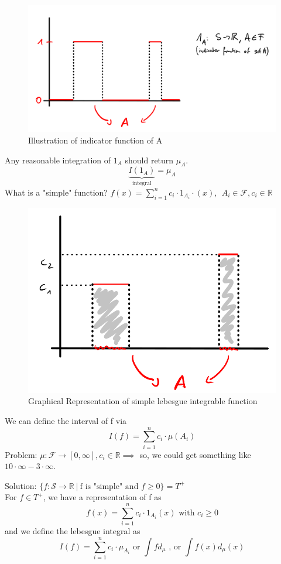 \documentclass[10pt,a4paper]{article}
\theoremstyle{definition}
\theoremstyle{plain}
\begin{document}
\begin{figure}[H]
	\centering
	\includegraphics[width=0.7\linewidth]{leb_detail}
	\caption{Illustration of indicator function of A}
	\label{fig:lebdetail}
\end{figure}
Any reasonable integration of $1_A$ should return $\mu_A$.
$$ \underbrace{I(1_A)}_{\text{integral}} = \mu_A$$
What is a "simple" function? $ f(x) = \sum_{i=1}^{n} c_i \cdot 1_{A_{i}} \cdot (x), \ \ A_i \in \mathcal{F}, c_i \in \mathbb{R}$\\
\begin{figure}[H]
	\centering
	\includegraphics[width=0.5\linewidth]{simple_leb}
	\caption{Graphical Representation of simple lebesgue integrable function}
	\label{fig:simplefun}
\end{figure}


We can define the interval of f via
$$ I(f) = \sum_{i = 1}^{n} c_i \cdot \mu(A_i)$$
Problem: $\mu: \mathcal{F} \to [0, \infty], c_i \in \mathbb{R} \implies$ so, we could get something like $10 \cdot \infty - 3 \cdot \infty$.\newline

Solution: $\{f: \mathcal{S} \to \mathbb{R}\ \big| \ \text{f is "simple" and } f \geq 0\} = T^+
$\\

For $f \in T^+$, we have a representation of f as
$$f(x) = \sum_{i=1}^{n} c_i \cdot 1_{A_i}(x) \text{ with } c_i \geq 0$$
and we define the lebesgue integral as 
$$ I(f) = \sum_{i=1}^{n} c_i \cdot \mu_{A_i} \text{ or } \int f d_{\mu} \text{ , or } \int f(x) d_{\mu}(x)$$
\end{document}
